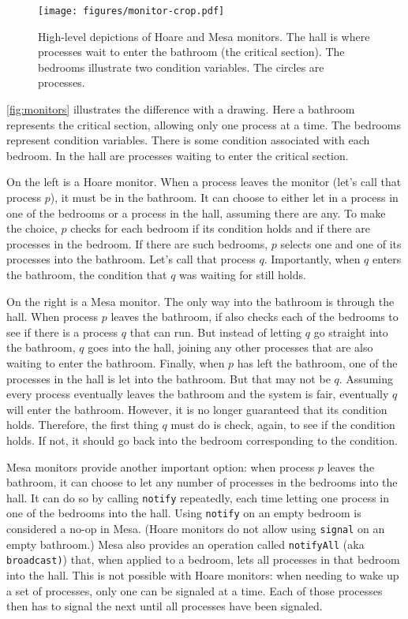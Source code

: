 \documentclass{report}
\begin{document}
\begin{figure}
\begin{center}
\texttt{[image: figures/monitor-crop.pdf]}
\end{center}
\caption{High-level depictions of Hoare and Mesa monitors.  The hall is
where processes wait to enter the bathroom (the critical section).  The
bedrooms illustrate two condition variables.  The circles are processes.}
\label{fig:monitors}
\end{figure}

\autoref{fig:monitors} illustrates the difference with a drawing.
Here a bathroom represents the critical section, allowing only one
process at a time.  The bedrooms represent condition variables.
There is some condition associated with each bedroom.
In the hall are processes waiting to enter the critical section.

On the left is a Hoare monitor.  When a process leaves the monitor
(let's call that process $p$), it must be in the bathroom.
It can choose to either let in a process
in one of the bedrooms or a process in the hall, assuming there are any.
To make the choice, $p$ checks for each bedroom if its condition holds
and if there are processes in the bedroom.
If there are such bedrooms, $p$ selects one and one of its processes into
the bathroom.  Let's call that process $q$.  Importantly, when $q$ enters
the bathroom, the condition that $q$ was waiting for still holds.

On the right is a Mesa monitor.  The only way into the bathroom is through
the hall.  When process $p$ leaves the bathroom,
if also checks each of the bedrooms to see if there is a process $q$ that
can run.  But instead of letting $q$ go straight into the bathroom, $q$
goes into the hall, joining any other processes that are also waiting to
enter the bathroom.  Finally, when $p$ has left the bathroom, one of the
processes in the hall is let into the bathroom.  But that may not be $q$.
Assuming every process eventually leaves the bathroom and the system is
fair, eventually $q$ will enter the bathroom.  However, it is no longer
guaranteed that its condition holds.  Therefore, the first thing $q$ must
do is check, again, to see if the condition holds.  If not, it should go back
into the bedroom corresponding to the condition.

Mesa monitors provide another important option:
when process $p$ leaves the bathroom, it can choose to let any number of
processes in the bedrooms into the hall.  It can do so by calling
\texttt{notify} repeatedly, each time letting one process in one of the
bedrooms into the hall.  Using \texttt{notify} on an empty
bedroom is considered a no-op in Mesa.  (Hoare monitors do not allow
using \texttt{signal} on an empty bathroom.) Mesa also provides an
operation called \texttt{notifyAll}
%
(aka \texttt{broadcast)})
%
that, when applied to
a bedroom, lets all processes in that bedroom into the hall.
This is not possible with Hoare monitors: when needing to wake up a set
of processes, only one can be signaled at a time.  Each of those processes
then has to signal the next until all processes have been signaled.
\end{document}
